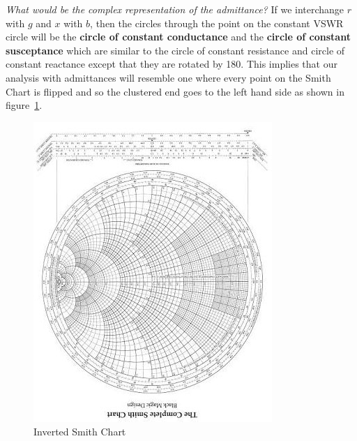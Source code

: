 \emph{What would be the complex representation of the admittance?}
If we interchange $r$ with $g$ and $x$ with $b$, then the circles through the point on the constant VSWR circle will be the \textbf{circle of constant conductance} and the \textbf{circle of constant susceptance} which are similar to the circle of constant resistance and circle of constant reactance except that they are rotated by 180\textdegree\;. This implies that our analysis with admittances will resemble one where every point on the Smith Chart is flipped and so the clustered end goes to the left hand side as shown in figure~\ref{fig:invertedsmithchart}.
\begin{figure}[h]
\centering
\includegraphics*[width=0.7\linewidth]{./graphics/smithchart1.jpeg}
\caption{Inverted Smith Chart}\label{fig:invertedsmithchart}
\end{figure}

